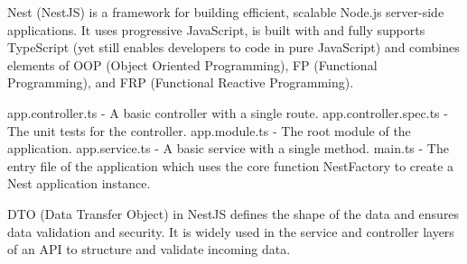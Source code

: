 
Nest (NestJS) is a framework for building efficient, scalable Node.js server-side applications. 
It uses progressive JavaScript, is built with and fully supports TypeScript (yet still enables developers to code in pure JavaScript) 
and combines elements of OOP (Object Oriented Programming), FP (Functional Programming), and FRP (Functional Reactive Programming).

app.controller.ts	- A basic controller with a single route.
app.controller.spec.ts	- The unit tests for the controller.
app.module.ts -	The root module of the application.
app.service.ts	- A basic service with a single method.
main.ts -	The entry file of the application which uses the core function NestFactory to create a Nest application instance.



DTO (Data Transfer Object) in NestJS defines the shape of the data and ensures data validation and security.
It is widely used in the service and controller layers of an API to structure and validate incoming data.